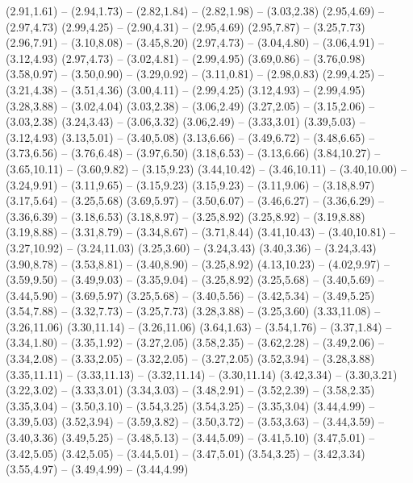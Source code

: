 {  (2.91,1.61) -- (2.94,1.73) -- (2.82,1.84) -- (2.82,1.98) -- (3.03,2.38)
  (2.95,4.69) -- (2.97,4.73)
  (2.99,4.25) -- (2.90,4.31) -- (2.95,4.69)
  (2.95,7.87) -- (3.25,7.73)
  (2.96,7.91) -- (3.10,8.08) -- (3.45,8.20)
  (2.97,4.73) -- (3.04,4.80) -- (3.06,4.91) -- (3.12,4.93)
  (2.97,4.73) -- (3.02,4.81) -- (2.99,4.95)
  (3.69,0.86) -- (3.76,0.98)
  (3.58,0.97) -- (3.50,0.90) -- (3.29,0.92) -- (3.11,0.81) -- (2.98,0.83)
  (2.99,4.25) -- (3.21,4.38) -- (3.51,4.36)
  (3.00,4.11) -- (2.99,4.25)
  (3.12,4.93) -- (2.99,4.95)
  (3.28,3.88) -- (3.02,4.04)
  (3.03,2.38) -- (3.06,2.49)
  (3.27,2.05) -- (3.15,2.06) -- (3.03,2.38)
  (3.24,3.43) -- (3.06,3.32)
  (3.06,2.49) -- (3.33,3.01)
  (3.39,5.03) -- (3.12,4.93)
  (3.13,5.01) -- (3.40,5.08)
  (3.13,6.66) -- (3.49,6.72) -- (3.48,6.65) -- (3.73,6.56) -- (3.76,6.48) -- (3.97,6.50)
  (3.18,6.53) -- (3.13,6.66)
  (3.84,10.27) -- (3.65,10.11) -- (3.60,9.82) -- (3.15,9.23)
  (3.44,10.42) -- (3.46,10.11) -- (3.40,10.00) -- (3.24,9.91) -- (3.11,9.65) -- (3.15,9.23)
  (3.15,9.23) -- (3.11,9.06) -- (3.18,8.97)
  (3.17,5.64) -- (3.25,5.68)
  (3.69,5.97) -- (3.50,6.07) -- (3.46,6.27) -- (3.36,6.29) -- (3.36,6.39) -- (3.18,6.53)
  (3.18,8.97) -- (3.25,8.92)
  (3.25,8.92) -- (3.19,8.88)
  (3.19,8.88) -- (3.31,8.79) -- (3.34,8.67) -- (3.71,8.44)
  (3.41,10.43) -- (3.40,10.81) -- (3.27,10.92) -- (3.24,11.03)
  (3.25,3.60) -- (3.24,3.43)
  (3.40,3.36) -- (3.24,3.43)
  (3.90,8.78) -- (3.53,8.81) -- (3.40,8.90) -- (3.25,8.92)
  (4.13,10.23) -- (4.02,9.97) -- (3.59,9.50) -- (3.49,9.03) -- (3.35,9.04) -- (3.25,8.92)
  (3.25,5.68) -- (3.40,5.69) -- (3.44,5.90) -- (3.69,5.97)
  (3.25,5.68) -- (3.40,5.56) -- (3.42,5.34) -- (3.49,5.25)
  (3.54,7.88) -- (3.32,7.73) -- (3.25,7.73)
  (3.28,3.88) -- (3.25,3.60)
  (3.33,11.08) -- (3.26,11.06)
  (3.30,11.14) -- (3.26,11.06)
  (3.64,1.63) -- (3.54,1.76) -- (3.37,1.84) -- (3.34,1.80) -- (3.35,1.92) -- (3.27,2.05)
  (3.58,2.35) -- (3.62,2.28) -- (3.49,2.06) -- (3.34,2.08) -- (3.33,2.05) -- (3.32,2.05) -- (3.27,2.05)
  (3.52,3.94) -- (3.28,3.88)
  (3.35,11.11) -- (3.33,11.13) -- (3.32,11.14) -- (3.30,11.14)
  (3.42,3.34) -- (3.30,3.21)
  (3.22,3.02) -- (3.33,3.01)
  (3.34,3.03) -- (3.48,2.91) -- (3.52,2.39) -- (3.58,2.35)
  (3.35,3.04) -- (3.50,3.10) -- (3.54,3.25)
  (3.54,3.25) -- (3.35,3.04)
  (3.44,4.99) -- (3.39,5.03)
  (3.52,3.94) -- (3.59,3.82) -- (3.50,3.72) -- (3.53,3.63) -- (3.44,3.59) -- (3.40,3.36)
  (3.49,5.25) -- (3.48,5.13) -- (3.44,5.09) -- (3.41,5.10)
  (3.47,5.01) -- (3.42,5.05)
  (3.42,5.05) -- (3.44,5.01) -- (3.47,5.01)
  (3.54,3.25) -- (3.42,3.34)
  (3.55,4.97) -- (3.49,4.99) -- (3.44,4.99)
}
